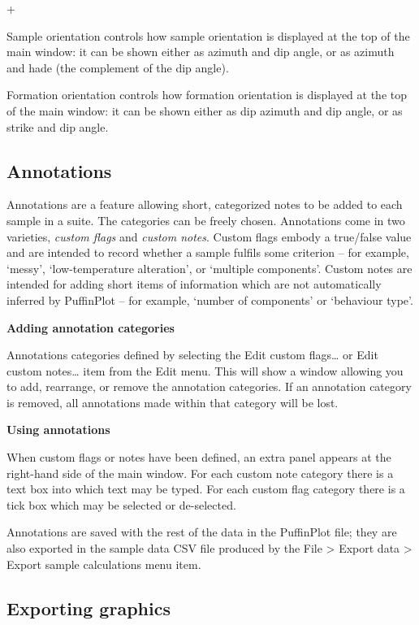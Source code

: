 \documentclass[a4paper,british]{article}
\newcommand{\menuitemlabel}[1]{%
\mbox{\textsf{#1}}\hfil}
\newenvironment{menuitemlist}%
{\begin{list}{}{%
\renewcommand{\makelabel}{\menuitemlabel}%
\setlength{\labelwidth}{35pt}%
\setlength{\leftmargin}%
             {\labelwidth+\labelsep}}}%
{\end{list}}
\newcommand{\ppcmd}[1]{\textsf{#1}} %
\newcommand{\caps}[1]{\MakeTextUppercase{#1}} %
\newcommand{\submenu}{ \textgreater{} } %
\newcommand{\quot}[1]{`#1'}
\newcommand{\mypara}[1]{\noindent\textbf{#1}

\noindent\ignorespaces} %
\begin{document}
\begin{menuitemlist}
\item[Sample orientation] controls how sample orientation is displayed at the
  top of the main window: it can be shown either as azimuth and dip angle, or
  as azimuth and hade (the complement of the dip angle).

\item[Formation orientation] controls how formation orientation is displayed
  at the top of the main window: it can be shown either as dip azimuth and
  dip angle, or as strike and dip angle.

\end{menuitemlist}

\subsection{\label{sec:annotations}Annotations}

Annotations are a feature allowing short, categorized notes to be added to
each sample in a suite. The categories can be freely chosen. Annotations come
in two varieties, \emph{custom flags} and \emph{custom notes}. Custom flags
embody a true/false value and are intended to record whether a sample fulfils
some criterion -- for example, \quot{messy}, \quot{low-temperature
  alteration}, or \quot{multiple components}. Custom notes are intended for
adding short items of information which are not automatically inferred by
PuffinPlot -- for example, \quot{number of components} or \quot{behaviour
  type}.

\mypara{Adding annotation categories}Annotations categories defined by
selecting the \ppcmd{Edit custom flags\ldots} or \ppcmd{Edit custom
  notes\ldots} item from the \ppcmd{Edit} menu. This will show a window
allowing you to add, rearrange, or remove the annotation categories. If
an annotation category is removed, all annotations made within that
category will be lost.

\mypara{Using annotations}When custom flags or notes have been defined,
an extra panel appears at the right-hand side of the main window. For
each custom note category there is a text box into which text may be
typed. For each custom flag category there is a tick box which may be
selected or de-selected.

Annotations are saved with the rest of the data in the PuffinPlot file; they
are also exported in the sample data \caps{csv} file produced by the
\ppcmd{File\submenu Export data\submenu Export sample calculations} menu
item.

\subsection{\label{sec:graphics-export}Exporting graphics}
\end{document}
